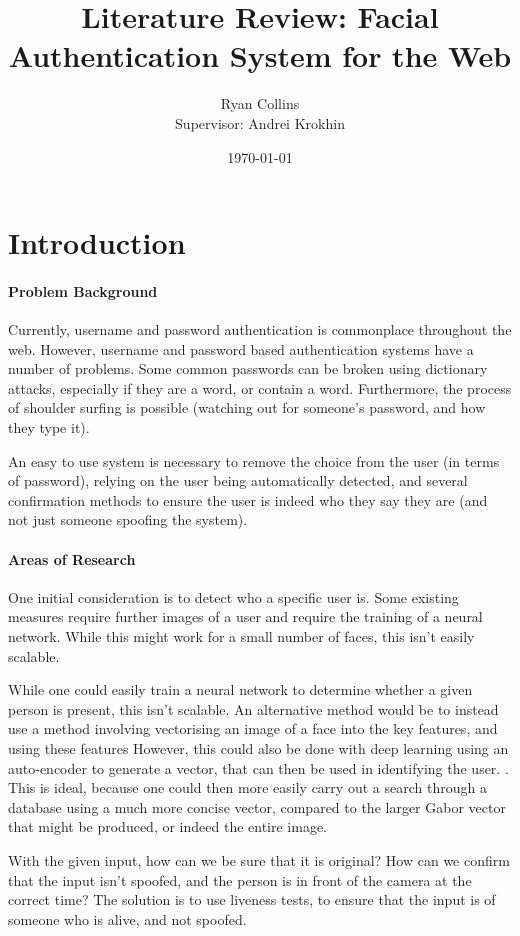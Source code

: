 \documentclass[14pt]{article}
\title{Literature Review: Facial Authentication System for the Web}
\author{
        Ryan Collins\\
        Supervisor: Andrei Krokhin
}
\date{\today}
\begin{document}
\maketitle

\section{Introduction}
\paragraph{Problem Background}
Currently, username and password authentication is commonplace throughout the web. However, username and password
based authentication systems have a number of problems. Some common passwords can be broken using dictionary attacks,
especially if they are a word, or contain a word. Furthermore, the process of shoulder surfing is possible (watching out
for someone's password, and how they type it).

An easy to use system is necessary to remove the choice from the user (in terms of password), relying on the user being automatically
detected, and several confirmation methods to ensure the user is indeed who they say they are (and not just someone spoofing the system).

\paragraph{Areas of Research}
One initial consideration is to detect who a specific user is. Some existing measures require further images of a user
and require the training of a neural network. While this might work for a small number of faces, this isn't easily scalable.

While one could easily train a neural network to determine whether a given person is present, this isn't scalable.
An alternative method would be to instead use a method involving vectorising an image of a face into the key features,
and using these features 
\cite{FaceRecognitionGabor}
However, this could also be done with deep learning using an auto-encoder to generate a vector, that can then be used in identifying the user.
\cite{FaceRecognitionAutoencoder}. This is ideal, because one could then more easily carry out a search through a database using a much more concise vector, compared to the larger
Gabor vector that might be produced, or indeed the entire image.

With the given input, how can we be sure that it is original? How can we confirm that the input isn't spoofed,
and the person is in front of the camera at the correct time? The solution is to use liveness tests, to ensure
that the input is of someone who is alive, and not spoofed. 
\end{document}
